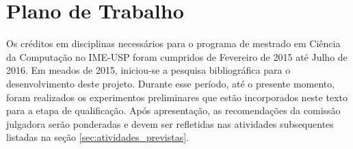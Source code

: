 \chapter{Plano de Trabalho}
\label{cap:conclusoes}

Os créditos em disciplinas necessários para o programa de mestrado em Ciência da Computação no IME-USP foram cumpridos de Fevereiro de 2015 até Julho de 2016. Em meados de 2015, iniciou-se a pesquisa bibliográfica para o desenvolvimento deste projeto. Durante esse período, até o presente momento, foram realizados os experimentos preliminares que estão incorporados neste texto para a etapa de qualificação. Após apresentação, as recomendações da comissão julgadora serão ponderadas e devem ser refletidas nas atividades subsequentes listadas na seção \ref{sec:atividades_previstas}.

